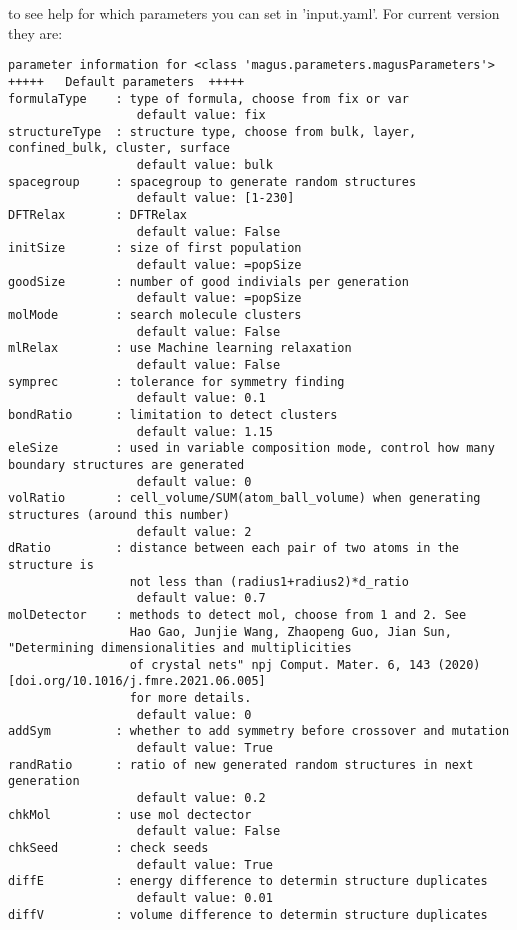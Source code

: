 \documentclass[12pt,oneside]{book}
\begin{document}
to see help for which parameters you can set in 'input.yaml'. For current version they are:
\begin{tcolorbox}
    \begin{verbatim}
parameter information for <class 'magus.parameters.magusParameters'>
+++++	Default parameters	+++++
formulaType    : type of formula, choose from fix or var
                  default value: fix
structureType  : structure type, choose from bulk, layer, confined_bulk, cluster, surface
                  default value: bulk
spacegroup     : spacegroup to generate random structures
                  default value: [1-230]
DFTRelax       : DFTRelax
                  default value: False
initSize       : size of first population
                  default value: =popSize
goodSize       : number of good indivials per generation
                  default value: =popSize
molMode        : search molecule clusters
                  default value: False
mlRelax        : use Machine learning relaxation
                  default value: False
symprec        : tolerance for symmetry finding
                  default value: 0.1
bondRatio      : limitation to detect clusters
                  default value: 1.15
eleSize        : used in variable composition mode, control how many boundary structures are generated
                  default value: 0
volRatio       : cell_volume/SUM(atom_ball_volume) when generating structures (around this number)
                  default value: 2
dRatio         : distance between each pair of two atoms in the structure is
                 not less than (radius1+radius2)*d_ratio
                  default value: 0.7
molDetector    : methods to detect mol, choose from 1 and 2. See
                 Hao Gao, Junjie Wang, Zhaopeng Guo, Jian Sun, "Determining dimensionalities and multiplicities
                 of crystal nets" npj Comput. Mater. 6, 143 (2020) [doi.org/10.1016/j.fmre.2021.06.005]
                 for more details.
                  default value: 0
addSym         : whether to add symmetry before crossover and mutation
                  default value: True
randRatio      : ratio of new generated random structures in next generation
                  default value: 0.2
chkMol         : use mol dectector
                  default value: False
chkSeed        : check seeds
                  default value: True
diffE          : energy difference to determin structure duplicates
                  default value: 0.01
diffV          : volume difference to determin structure duplicates

\end{verbatim}
\end{tcolorbox}
\end{document}
